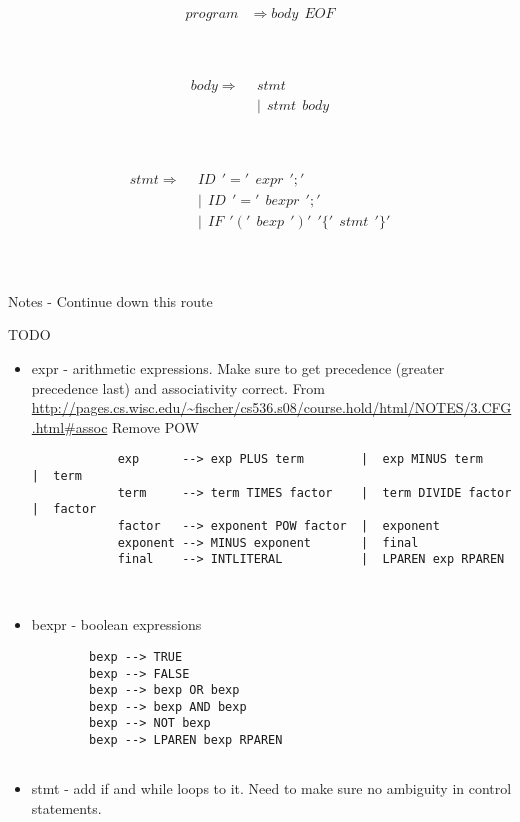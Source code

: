 \documentclass[12pt, letterpaper]{article}
\begin{document}
\fontsize{12}{16}\selectfont

	\begin{equation} \label{eq_2_1}
		\begin{aligned}
			program &\Rightarrow body\ \  EOF
		\end{aligned}
	\end{equation}
	
	\hfill\\\hfill\\
	\begin{equation} \label{eq_2_1}
		\begin{aligned}
			body \Rightarrow\ \ &stmt \\
				&|\ \ stmt\ \ body
		\end{aligned}
	\end{equation}
	
	\hfill\\\hfill\\
	\begin{equation} \label{eq_2_1}
		\begin{aligned}
			stmt \Rightarrow\ \ &ID\ \ '=' \ \ expr \ \ ';'\\
				&|\ \ ID\ \ '=' \ \ bexpr \ \ ';'\\
				&|\ \ IF\ \ '('\ \ bexp \ \ ')' \ \ '\{' \ \ stmt\ \ '\}'\\
		\end{aligned}
	\end{equation}
	
	\hfill\\\hfill\\
	Notes - Continue down this route
	
	TODO
	\begin{itemize}
		\item expr - arithmetic expressions. Make sure to get precedence (greater precedence last) and associativity correct.
		From \url{http://pages.cs.wisc.edu/~fischer/cs536.s08/course.hold/html/NOTES/3.CFG.html#assoc} Remove POW
		\begin{verbatim}
			exp      --> exp PLUS term        |  exp MINUS term      |  term
			term     --> term TIMES factor    |  term DIVIDE factor  |  factor
			factor   --> exponent POW factor  |  exponent
			exponent --> MINUS exponent       |  final
			final    --> INTLITERAL           |  LPAREN exp RPAREN

		
		\end{verbatim}
		
		
		\item bexpr - boolean expressions
		
		\begin{verbatim}
		bexp --> TRUE
		bexp --> FALSE
		bexp --> bexp OR bexp
		bexp --> bexp AND bexp
		bexp --> NOT bexp
		bexp --> LPAREN bexp RPAREN
		
		\end{verbatim}
		\item  stmt - add if and while loops to it. Need to make sure no ambiguity in control statements. 
	\end{itemize}
\end{document}
